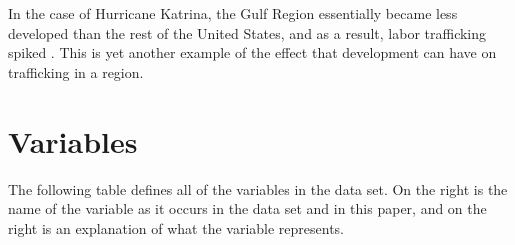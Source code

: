 \documentclass{article} %
\begin{document}
In the case of Hurricane Katrina, the Gulf Region essentially became less developed than the rest of the United States, and as a result, labor trafficking spiked \parencite{Climate}. This is yet another example of the effect that development can have on trafficking in a region.


	
	


\section{Variables}

The following table defines all of the variables in the data set. On the right is the name of the variable as it occurs in the data set and in this paper, and on the right is an explanation of what the variable represents.
\end{document}
